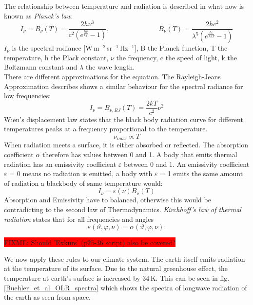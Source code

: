 \documentclass[a4paper,fleqn]{article}
\renewcommand{\epsilon}{\varepsilon}  %
\begin{document}
The relationship between temperature and radiation is described in what now is known as \textit{Planck's law}:
\begin{equation}
I_{\nu} = B_{\nu}(T) = \frac{2h\nu^3}{c^2(e^{\frac{h\nu}{kT}}-1)}, 
               \hspace{3cm} B_{\nu}(T) = \frac{2hc^2}{\lambda^5(e^{\frac{hc}{\lambda kT}}-1)}
\end{equation}
$I_\nu$ is the spectral radiance [W\,m$^{-2}$\,sr$^{-1}$\,Hz$^{-1}$], B the Planck function, T the temperature, h the  Plack constant, $\nu$ the frequency, c the speed of light, k the Boltzmann constant and $\lambda$ the wave length.\\
There are different approximations for the equation. The Rayleigh-Jeans Approximation describes shows a similar behaviour for the spectral radiance for low frequencies:
\begin{equation}
I_{\nu} = B_{\nu, RJ}(T) = \frac{2kT}{c^2}\nu^2
\end{equation}
Wien's displacement law states that the black body radiation curve for different temperatures peaks at a frequency proportional to the temperature.
\begin{equation}
\nu_{max} \propto T
\end{equation}
When radiation meets a surface, it is either absorbed or reflected. The absorption coefficient $\alpha$ therefore has values between 0 and 1. A body that emits thermal radiation has an emissivity coefficient $\epsilon$ between 0 and 1. An emissivity coefficient $\epsilon$ = 0 means no radiation is emitted, a body with $\epsilon$ = 1 emits the same amount of radiation a blackbody of same temperature would:
\begin{equation}
I_\nu = \epsilon(\nu)B_\nu(T)
\end{equation}
Absorption and Emissivity have to balanced, otherwise this would be contradicting to the second law of Thermodynamics. \textit{Kirchhoff's law of thermal radiation} states that for all frequencies and angles 
\begin{equation}
\epsilon(\vartheta,\varphi,\nu) = \alpha(\vartheta,\varphi,\nu).
\end{equation}

\colorbox{red}{FIXME: Should 'Exkurs' (p25-36 script) also be covered?} \vspace{1cm}

We now apply these rules to our climate system. The earth itself emits radiation at the temperature of its surface. Due to the natural greenhouse effect, the temperature at earth's surface is increased by 34\,K. This can be seen in fig. \ref{Buehler_et_al_OLR_spectra} which shows the spectra of longwave radiation of the earth as seen from space.
\end{document}
